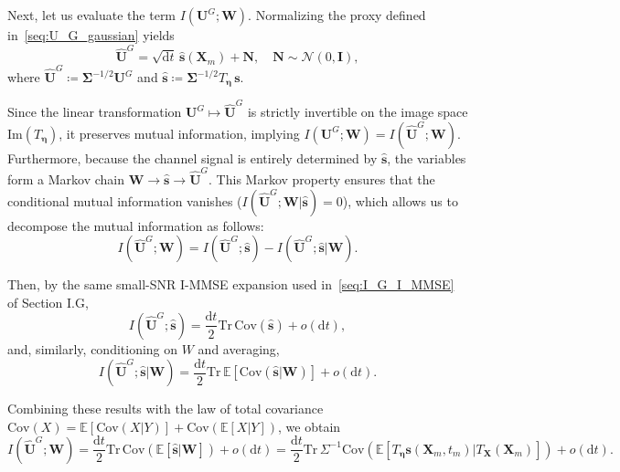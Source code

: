 \documentclass[
 longbibliography,
 twocolumn,
 superscriptaddress,
 amsmath,
 amssymb,
 amsthm,
 amsfonts,
 prl,
 floatfix,
]{revtex4-2}
\newcommand{\matbf}[1]{\boldsymbol{\mathsf{#1}}}
\begin{document}
\begin{widetext}
Next, let us evaluate the term $I(\bm U^G;\bm W)$. Normalizing the proxy defined in~\eqref{seq:U_G_gaussian} yields
\[
    \hat{\bm U}^G=\sqrt{\mathrm dt}\,\hat{\bm s}(\bm X_m)+\bm N,
    \quad\bm N\sim\mathcal N(0,\mathbf I),
\]
where $\hat{\bm U}^G\coloneq\mathbf\Sigma^{-1/2}\bm U^G$ and $\hat{\bm s}\coloneq\mathbf\Sigma^{-1/2}T_{\bm\eta}\,\bm s$. 

Since the linear transformation $\bm U^G\mapsto\hat{\bm U}^G$ is strictly invertible on the image space $\mathrm{Im}(T_{\bm\eta})$, it preserves mutual information, implying $I(\bm U^G;\bm W)=I(\hat{\bm U}^G;\bm W)$. Furthermore, because the channel signal is entirely determined by $\hat{\bm s}$, the variables form a Markov chain $\bm W \to \hat{\bm s} \to \hat{\bm U}^G$.
This Markov property ensures that the conditional mutual information vanishes ($I(\hat{\bm U}^G;\bm W|\hat{\bm s})=0$), which allows us to decompose the mutual information as follows:
\[
    I(\hat{\bm U}^G;\bm W)=
    I(\hat{\bm U}^G;\hat{\bm s})-I(\hat{\bm U}^G;\hat{\bm s}|\bm W).
\]

Then, by the same small-SNR I-MMSE expansion used in~\eqref{seq:I_G_I_MMSE} of Section I.G,
\[
    I(\hat{\bm U}^G;\hat{\bm s})=
    \frac{\mathrm dt}{2}\mathrm{Tr}\,\mathrm{Cov}(\hat{\bm s})+o(\mathrm dt),
\]
and, similarly, conditioning on $W$ and averaging,
\[
    I(\hat{\bm U}^G;\hat{\bm s}|\bm W)=
    \frac{\mathrm dt}{2}\mathrm{Tr}\,
    \mathbb E[\mathrm{Cov}(\hat{\bm s}|\bm W)]+o(\mathrm dt).
\]

Combining these results with the law of total covariance $\mathrm{Cov}(X)=\mathbb E[\mathrm{Cov}(X|Y)]+\mathrm{Cov}(\mathbb E[X|Y])$, we obtain
\begin{equation}
    I(\hat{\bm U}^G;\bm W)=
    \frac{\mathrm dt}{2}\mathrm{Tr}\,\mathrm{Cov}
    (\mathbb E[\hat{\bm s}|\bm W])+o(\mathrm dt)
    =
    \frac{\mathrm dt}{2}\mathrm{Tr}\,\matbf\Sigma^{-1}\mathrm{Cov}
    (\mathbb E[T_{\bm\eta}\bm s(\bm X_m,t_m)|T_{\bm X}(\bm X_m)])+o(\mathrm dt).
    \label{seq:I_U_hat_G_W_I_MMSE}
\end{equation}


\end{widetext}
\end{document}
